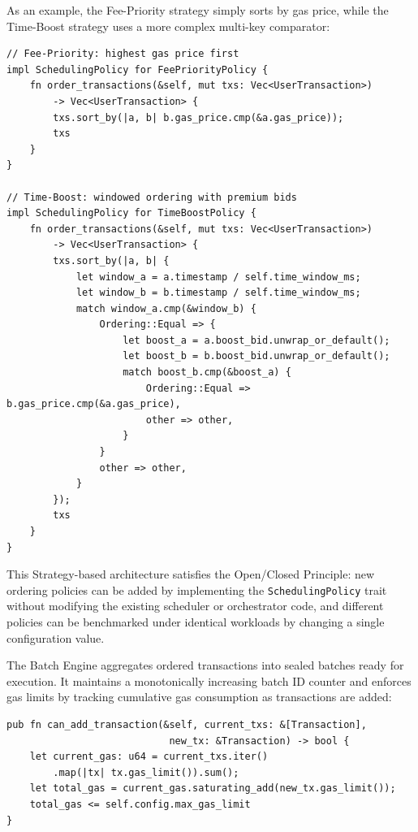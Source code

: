 As an example, the Fee-Priority strategy simply sorts by gas price, while the Time-Boost strategy uses a more complex multi-key comparator:

\begin{lstlisting}[style=rustStyle, caption={Concrete strategy implementations (Fee-Priority and Time-Boost)}, label={lst:policies}]
// Fee-Priority: highest gas price first
impl SchedulingPolicy for FeePriorityPolicy {
    fn order_transactions(&self, mut txs: Vec<UserTransaction>)
        -> Vec<UserTransaction> {
        txs.sort_by(|a, b| b.gas_price.cmp(&a.gas_price));
        txs
    }
}

// Time-Boost: windowed ordering with premium bids
impl SchedulingPolicy for TimeBoostPolicy {
    fn order_transactions(&self, mut txs: Vec<UserTransaction>)
        -> Vec<UserTransaction> {
        txs.sort_by(|a, b| {
            let window_a = a.timestamp / self.time_window_ms;
            let window_b = b.timestamp / self.time_window_ms;
            match window_a.cmp(&window_b) {
                Ordering::Equal => {
                    let boost_a = a.boost_bid.unwrap_or_default();
                    let boost_b = b.boost_bid.unwrap_or_default();
                    match boost_b.cmp(&boost_a) {
                        Ordering::Equal => b.gas_price.cmp(&a.gas_price),
                        other => other,
                    }
                }
                other => other,
            }
        });
        txs
    }
}
\end{lstlisting}

This Strategy-based architecture satisfies the Open/Closed Principle: new ordering policies can be added by implementing the \texttt{SchedulingPolicy} trait without modifying the existing scheduler or orchestrator code, and different policies can be benchmarked under identical workloads by changing a single configuration value.


The Batch Engine aggregates ordered transactions into sealed batches ready for execution. It maintains a monotonically increasing batch ID counter and enforces gas limits by tracking cumulative gas consumption as transactions are added:

\begin{lstlisting}[style=rustStyle, caption={Gas limit enforcement in batch engine}, label={lst:gas-limit}]
pub fn can_add_transaction(&self, current_txs: &[Transaction],
                            new_tx: &Transaction) -> bool {
    let current_gas: u64 = current_txs.iter()
        .map(|tx| tx.gas_limit()).sum();
    let total_gas = current_gas.saturating_add(new_tx.gas_limit());
    total_gas <= self.config.max_gas_limit
}
\end{lstlisting}

